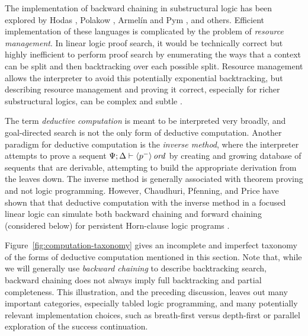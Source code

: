 The implementation of backward chaining in substructural logic has
been explored by Hodas \cite{hodas94logic}, Polakow
\cite{polakow00linear,polakow01ordered}, Armel\'in and Pym
\cite{armelin01bunched}, and others. Efficient implementation of these
languages is complicated by the problem of {\it resource
  management}. In linear logic proof search, it would be technically
correct but highly inefficient to perform proof search by enumerating
the ways that a context can be split and then backtracking over each
possible split. Resource management allows the interpreter to avoid
this potentially exponential backtracking, but describing resource
management and proving it correct, especially for richer substructural
logics, can be complex and subtle \cite{cervesato00efficient}.

The term {\it deductive computation} is meant to be interpreted very
broadly, and goal-directed search is not the only form of deductive
computation. Another paradigm for deductive computation is the {\it
  inverse method}, where the interpreter attempts to prove a sequent
${\Psi};{\Delta} \vdash {{\langle {p^-} \rangle}\,{{\it ord}}} \mathstrut$ by creating and growing
database of sequents that are derivable, attempting to build the
appropriate derivation from the leaves down. The inverse method is
generally associated with theorem proving and not logic
programming. However, Chaudhuri, Pfenning, and Price have shown that
that deductive computation with the inverse method in a focused linear
logic can simulate both backward chaining and forward chaining
(considered below) for persistent Horn-clause logic programs
\cite{chaudhuri10logical}. 

Figure~\ref{fig:computation-taxonomy} gives an incomplete and
imperfect taxonomy of the forms of deductive computation mentioned in
this section. Note that, while we will generally use {\it backward
  chaining} to describe backtracking search, backward chaining does
not always imply full backtracking and partial completeness. This
illustration, and the preceding discussion, leaves out many important
categories, especially tabled logic programming, and many potentially
relevant implementation choices, such as breath-first versus
depth-first or parallel exploration of the success continuation.

